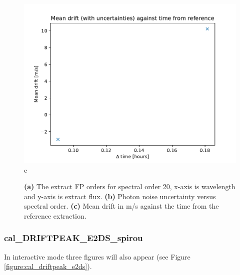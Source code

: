 \begin{figure}
\begin{center}
\begin{minipage}{.495\textwidth}
\begin{center}
\includegraphics[width=\textwidth]{Figures/cal_drift_e2ds_3.pdf}
c
\end{center}
\end{minipage}%
\end{center}

\caption{\textbf{(a)} The extract FP orders for spectral order 20, x-axis is wavelength and y-axis is extract flux.  \textbf{(b)} Photon noise uncertainty versus spectral order. \textbf{(c)} Mean drift in m/s against the time from the reference extraction. \label{figure:cal_drift_e2ds}}
\end{figure}

\newpage
\subsubsection{cal\_DRIFTPEAK\_E2DS\_spirou}

\noindent In interactive mode three figures will also appear (see Figure \ref{figure:cal_driftpeak_e2ds}).

